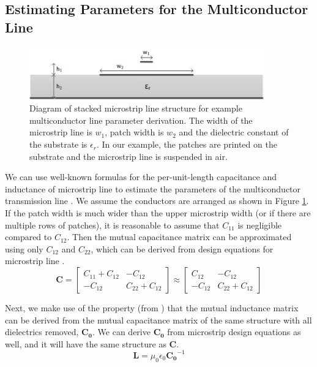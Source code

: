 \documentclass{allertonproc}
\begin{document}
\subsection{Estimating Parameters for the Multiconductor Line}
\begin{figure}[tb]
\begin{center}
\includegraphics[width=4in]{ustrip_example}
\caption{Diagram of stacked microstrip line structure for example multiconductor line parameter derivation. The width of the microstrip line is $w_1$, patch width is $w_2$ and the dielectric constant of the substrate is $\epsilon_r$.  In our example, the patches are printed on the substrate and the microstrip line is suspended in air.}
\label{ustrip_example}
\end{center}
\end{figure}
We can use well-known formulas for the per-unit-length capacitance and inductance of microstrip line to estimate the parameters of the multiconductor transmission line \cite{microstrip}. We assume the conductors are arranged as shown in Figure \ref{ustrip_example}. If the patch width is much wider than the upper microstrip width (or if there are multiple rows of patches), it is reasonable to assume that $C_{11}$ is negligible compared to $C_{12}$.  Then the mutual capacitance matrix can be approximated using only $C_{12}$ and $C_{22}$, which can be derived from design equations for microstrip line \cite{microstrip}.
\begin{equation}
\mathbf{C} = \begin{bmatrix}C_{11}+C_{12} & -C_{12} \\ -C_{12} & C_{22}+C_{12} \end{bmatrix} \approx \begin{bmatrix}C_{12} & -C_{12} \\ -C_{12} & C_{22}+C_{12} \end{bmatrix}
\end{equation}

Next, we make use of the property (from \cite{fariabook}) that the mutual inductance matrix can be derived from the mutual capacitance matrix of the same structure with all dielectrics removed, $\mathbf{C_0}$.  We can derive $\mathbf{C_0}$ from microstrip design equations as well, and it will have the same structure as $\mathbf{C}$.
\begin{equation}
\mathbf{L} = \mu_0 \epsilon_0 \mathbf{C_0}^{-1}
\end{equation}
\end{document}
